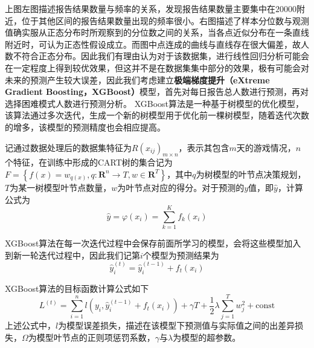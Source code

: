 \documentclass{MathModeling}
\begin{document}
	上图左图描述报告结果数量与频率的关系，发现报告结果数量主要集中在$20000$附近，位于其他区间的报告结果数量出现的频率很小。右图描述了样本分位数与观测值确实服从正态分布时所观察到的分位数之间的关系，当各点近似分布在一条直线附近时，可认为正态性假设成立。而图中点连成的曲线与直线存在很大偏差，故人数不符合正态分布。因此我们有理由认为对于该数据集，进行线性回归分析可能会在一定程度上得到较优效果，但这并不是在数据集集中部分的效果，极有可能会对未来的预测产生较大误差，因此我们考虑建立\textbf{极端梯度提升（eXtreme Gradient Boosting，XGBoost）}模型，首先对每日报告总人数进行预测，再对选择困难模式人数进行预测分析。
	XGBoost算法是一种基于树模型的优化模型，该算法通过多次迭代，生成一个新的树模型用于优化前一棵树模型，随着迭代次数的增多，该模型的预测精度也会相应提高\textcolor{blue}{\cite{pxgboost1}}。

		记通过数据处理后的数据集特征为$R\left(x_{ij}\right)_{m\times n}$，表示其包含$m$天的游戏情况，$n$个特征，在训练中形成的CART树的集合记为$F=\left\{f\left(x\right)=w_{q\left(x\right)},q:\mathbf{R}^n\to T,w\in \mathbf{R}^T\right\}$，其中$q$为树模型的叶节点决策规划，$T$为某一树模型叶节点数量，$w$为叶节点对应的得分\textcolor{blue}{\cite{pxgboost2}}。对于预测的$y$值，即$\hat{y}$，计算公式为
		\begin{equation}
			\hat{y}=\varphi \left( x_i \right) =\sum\limits_{k=1}^K{f_k\left( x_i \right)} \label{fXGBoostypre}
		\end{equation}
	
		XGBoost算法在每一次迭代过程中会保存前面所学习的模型，会将这些模型加入到新一轮迭代过程中，因此我们记第$i$个模型为预测结果为
		\begin{equation}
			\hat{y}_{i}^{\left(t\right)}=\hat{y}_{i}^{\left(t-1\right)}+f_t\left(x_i\right) \label{fXGBoostyprei}
		\end{equation}
		
		XGBoost算法的目标函数计算公式如下
		\begin{equation}
			L^{\left(t\right)}=\sum\limits_{i=1}^{n}l\left(y_i,\hat{y}_{i}^{\left(t-1\right)}+f_t\left(x_i\right)\right)+\gamma T+\frac{1}{2}\lambda\sum\limits_{j=1}^T{w_j^2}+\mathrm{const} \label{fXGBoostL}
		\end{equation}
		上述公式中，$l$为模型误差损失，描述在该模型下预测值与实际值之间的出差异损失，$\Omega$为模型叶节点的正则项惩罚系数，$\gamma$与$\lambda$为模型的超参数\textcolor{blue}{\cite{pxgboost2}}。
		
\end{document}
